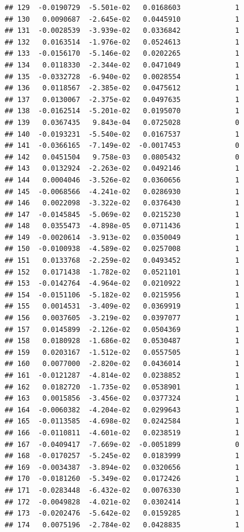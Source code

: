 \documentclass[12pt]{article}\usepackage[]{graphicx}\usepackage[]{xcolor}
\makeatletter
\newenvironment{kframe}{%
 \def\at@end@of@kframe{}%
 \ifinner\ifhmode%
  \def\at@end@of@kframe{\end{minipage}}%
  \begin{minipage}{\columnwidth}%
 \fi\fi%
 \def\FrameCommand##1{\hskip\@totalleftmargin \hskip-\fboxsep
 \colorbox{shadecolor}{##1}\hskip-\fboxsep
     \hskip-\linewidth \hskip-\@totalleftmargin \hskip\columnwidth}%
 \MakeFramed {\advance\hsize-\width
   \@totalleftmargin\z@ \linewidth\hsize
   \@setminipage}}%
 {\par\unskip\endMakeFramed%
 \at@end@of@kframe}
\newenvironment{knitrout}{}{} %
\makeatother
\begin{document}
\begin{knitrout}
\begin{kframe}
\begin{verbatim}
## 129  -0.0190729  -5.501e-02   0.0168603             1
## 130   0.0090687  -2.645e-02   0.0445910             1
## 131  -0.0028539  -3.939e-02   0.0336842             1
## 132   0.0163514  -1.976e-02   0.0524613             1
## 133  -0.0156170  -5.146e-02   0.0202265             1
## 134   0.0118330  -2.344e-02   0.0471049             1
## 135  -0.0332728  -6.940e-02   0.0028554             1
## 136   0.0118567  -2.385e-02   0.0475612             1
## 137   0.0130067  -2.375e-02   0.0497635             1
## 138  -0.0162514  -5.201e-02   0.0195070             1
## 139   0.0367435   9.843e-04   0.0725028             0
## 140  -0.0193231  -5.540e-02   0.0167537             1
## 141  -0.0366165  -7.149e-02  -0.0017453             0
## 142   0.0451504   9.758e-03   0.0805432             0
## 143   0.0132924  -2.263e-02   0.0492146             1
## 144   0.0004046  -3.526e-02   0.0360656             1
## 145  -0.0068566  -4.241e-02   0.0286930             1
## 146   0.0022098  -3.322e-02   0.0376430             1
## 147  -0.0145845  -5.069e-02   0.0215230             1
## 148   0.0355473  -4.898e-05   0.0711436             1
## 149  -0.0020614  -3.913e-02   0.0350049             1
## 150  -0.0100938  -4.589e-02   0.0257008             1
## 151   0.0133768  -2.259e-02   0.0493452             1
## 152   0.0171438  -1.782e-02   0.0521101             1
## 153  -0.0142764  -4.964e-02   0.0210922             1
## 154  -0.0151106  -5.182e-02   0.0215956             1
## 155   0.0014531  -3.409e-02   0.0369919             1
## 156   0.0037605  -3.219e-02   0.0397077             1
## 157   0.0145899  -2.126e-02   0.0504369             1
## 158   0.0180928  -1.686e-02   0.0530487             1
## 159   0.0203167  -1.512e-02   0.0557505             1
## 160   0.0077000  -2.820e-02   0.0436014             1
## 161  -0.0121287  -4.814e-02   0.0238852             1
## 162   0.0182720  -1.735e-02   0.0538901             1
## 163   0.0015856  -3.456e-02   0.0377324             1
## 164  -0.0060382  -4.204e-02   0.0299643             1
## 165  -0.0113585  -4.698e-02   0.0242584             1
## 166  -0.0110811  -4.601e-02   0.0238519             1
## 167  -0.0409417  -7.669e-02  -0.0051899             0
## 168  -0.0170257  -5.245e-02   0.0183999             1
## 169  -0.0034387  -3.894e-02   0.0320656             1
## 170  -0.0181260  -5.349e-02   0.0172426             1
## 171  -0.0283448  -6.432e-02   0.0076330             1
## 172  -0.0049828  -4.021e-02   0.0302414             1
## 173  -0.0202476  -5.642e-02   0.0159285             1
## 174   0.0075196  -2.784e-02   0.0428835             1

\end{verbatim}
\end{kframe}
\end{knitrout}
\end{document}
